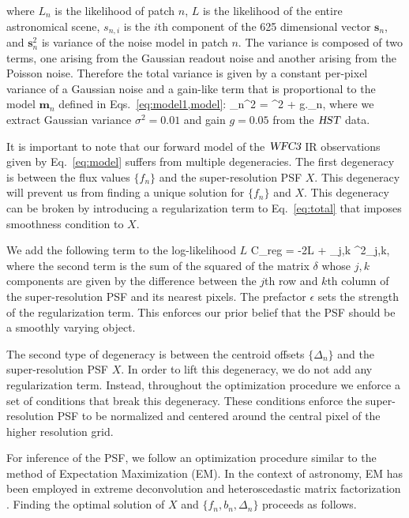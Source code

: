 where $L_{n}$ is the likelihood of patch $n$, $L$ is the likelihood of the entire astronomical scene, $s_{n,i}$ is the $i$th component of the 625 dimensional vector $\mathbf{s}_n$, and 
$\mathbf{s}_n^{2}$ is variance of the noise model in patch $n$. The variance is composed of two terms, one arising from the Gaussian readout noise and another arising from the Poisson noise.
Therefore the total variance is given by a constant per-pixel variance of a Gaussian noise and a gain-like term that is proportional to the model $\mathbf{m}_{n}$ defined in Eqs.~\ref{eq:model1,model}:
\beq
{}_n^{2} = \sigma^{2} + g._{n},
\label{eq:variance}
\eeq
where we extract Gaussian variance $\sigma^{2}=0.01$ and gain $g=0.05$ from the ${\textsl{HST}}$ data. 

It is important to note that our forward model of the ${\textsl{WFC3}}$ IR 
observations given by Eq.~\ref{eq:model} suffers from multiple degeneracies. The first degeneracy is between 
the flux values $\{f_n\}$ and the super-resolution PSF $X$. This degeneracy will prevent us from finding a unique 
solution for $\{f_n\}$ and $X$. This degeneracy can be broken by introducing a regularization term to Eq.~\ref{eq:total} that imposes 
smoothness condition to $X$. 

We add the following term to the log-likelihood $L$
\beq
C_{\rm reg} = -2\ln L + \epsilon \sum_{j,k} \delta^{2}_{j,k},
\label{eq:reg}
\eeq
where the second term is the sum of the squared of the matrix $\delta$ whose $j,k$ components are given by the difference between the $j$th row and $k$th column of the super-resolution PSF 
and its nearest pixels. The prefactor $\epsilon$ sets the strength of the regularization term. This enforces our prior belief that the PSF should be a smoothly varying object.

The second type of degeneracy is between the centroid offsets $\{\Delta_n\}$ and the super-resolution PSF $X$. In order to lift this degeneracy, we do not add any regularization 
term. Instead, throughout the optimization procedure we enforce a set of conditions that break this degeneracy. These conditions enforce the super-resolution 
PSF to be normalized and centered around the central pixel of the higher resolution grid. 

For inference of the PSF, we follow an optimization procedure similar to the method of Expectation Maximization (EM). In the context of astronomy, EM has been employed in extreme deconvolution \citep{xd} and heteroscedastic matrix factorization \citep{hmf}. Finding the optimal solution of 
$X$ and $\{f_n , b_n , \Delta_n\}$ proceeds as follows. 

